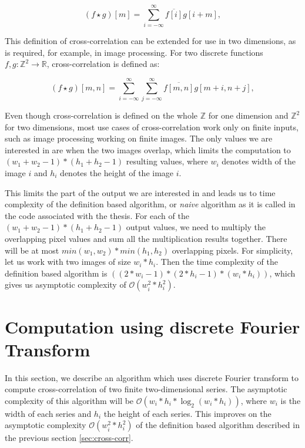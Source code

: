 \[
(f \star g)[m] = \sum_{i=-\infty}^{\infty} \overline{f[i]}g[i + m],
\] 



This definition of cross-correlation can be extended for use in two dimensions, as is required, for example, in image processing.
For two discrete functions \( f, g : \mathbb{Z}^2 \rightarrow \mathbb{R} \), cross-correlation is defined as:

\[
(f \star g)[m,n] = \sum_{i=-\infty}^{\infty} \sum_{j=-\infty}^{\infty} \overline{f[m,n]}g[m + i,n + j],
\]

Even though cross-correlation is defined on the whole $\mathbb{Z}$ for one dimension and $\mathbb{Z}^2$ for two dimensions, most use cases of cross-correlation work only on finite inputs, such as image processing working on finite images. The only values we are interested in are when the two images overlap, which limits the computation to $(w_1 + w_2 - 1) * (h_1 + h_2 - 1)$ resulting values, where $w_i$ denotes width of the image $i$ and $h_i$ denotes the height of the image $i$.

This limits the part of the output we are interested in and leads us to time complexity of the definition based algorithm, or \textit{naive} algorithm as it is called in the code associated with the thesis. For each of the $(w_1 + w_2 - 1) * (h_1 + h_2 - 1)$ output values, we need to multiply the overlapping pixel values and sum all the multiplication results together. There will be at most $min(w_1, w_2) * min(h_1, h_2)$ overlapping pixels. For simplicity, let us work with two images of size $w_i*h_i$. Then the time complexity of the definition based algorithm is $((2*w_i-1)*(2 * h_i - 1) * (w_i * h_i))$, which gives us asymptotic complexity of $\mathcal{O}(w_i^2*h_i^2)$.

\section{Computation using discrete Fourier Transform}
\label{sec:cross_corr_fft}

In this section, we describe an algorithm which uses discrete Fourier transform to compute cross-correlation of two finite two-dimensional series. The asymptotic complexity of this algorithm will be $\mathcal{O}(w_i*h_i*\log_2(w_i*h_i))$, where $w_i$ is the width of each series and $h_i$ the height of each series. This improves on the asymptotic complexity $\mathcal{O}(w_i^2*h_i^2)$ of the definition based algorithm described in the previous section \ref{sec:cross-corr}.

